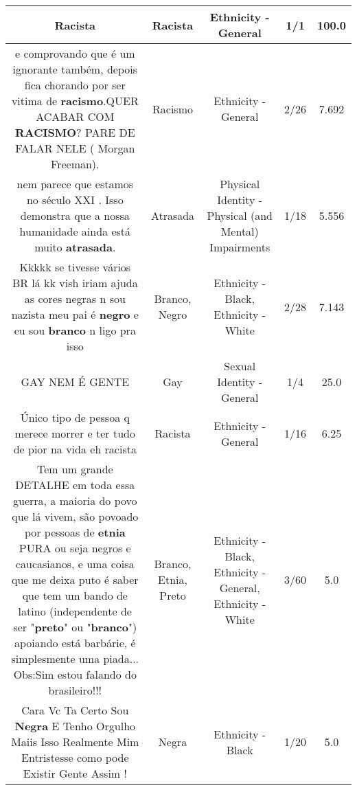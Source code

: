 \documentclass[11pt]{article}
\newlength\mylength
\begin{document}
\begin{center}
\begin{longtable}{|C{.65\mylength}|C{.30\mylength}|C{.12\mylength}|C{.12\mylength}|C{.12\mylength}|}
  \small Racista\normalsize   & Racista & Ethnicity - General & 1/1 & 100.0 \\  \hline
  \small e comprovando que é um ignorante também, depois fica chorando por ser vitima de \textbf{racismo}.QUER ACABAR COM \textbf{RACISMO}? PARE DE FALAR NELE                 ( Morgan Freeman).\normalsize   & Racismo & Ethnicity - General & 2/26 & 7.692 \\  \hline
  \small nem parece que estamos no século XXI . Isso demonstra que a nossa humanidade ainda está muito \textbf{atrasada}.\normalsize   & Atrasada & Physical Identity - Physical (and Mental) Impairments & 1/18 & 5.556 \\  \hline
  \small Kkkkk se tivesse vários BR lá kk vish iriam ajuda as cores negras n sou nazista meu pai é \textbf{negro} e eu sou \textbf{branco} n ligo pra isso\normalsize   & Branco, Negro & Ethnicity - Black, Ethnicity - White & 2/28 & 7.143 \\  \hline
  \small GAY NEM É GENTE\normalsize   & Gay & Sexual Identity - General & 1/4 & 25.0 \\  \hline
  \small Único tipo de pessoa q merece morrer e ter tudo de pior na vida eh racista\normalsize   & Racista & Ethnicity - General & 1/16 & 6.25 \\  \hline
  \small Tem um  grande DETALHE em toda essa guerra, a maioria do povo que lá vivem, são povoado por pessoas de \textbf{etnia} PURA ou seja negros e caucasianos, e uma coisa que me deixa puto é saber que tem um bando de latino (independente de ser "\textbf{preto}" ou "\textbf{branco}") apoiando está barbárie, é simplesmente uma piada... Obs:Sim estou falando do brasileiro!!!\normalsize   & Branco, Etnia, Preto & Ethnicity - Black, Ethnicity - General, Ethnicity - White & 3/60 & 5.0 \\  \hline
  \small Cara Vc Ta Certo Sou \textbf{Negra} E Tenho Orgulho Maiis Isso Realmente Mim Entristesse como pode Existir Gente Assim !\normalsize   & Negra & Ethnicity - Black & 1/20 & 5.0 \\  \hline

\end{longtable}
\end{center}
\end{document}
